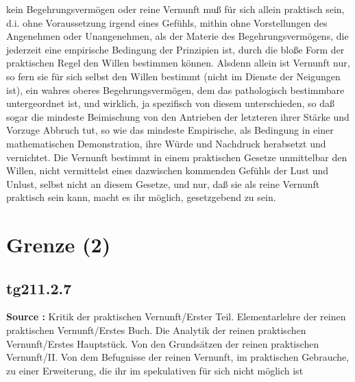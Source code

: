 \documentclass[a4paper,12pt,twoside]{book}
\newcommand{\unnumberedsection}[1]{
	\section*{#1}
	\addcontentsline{toc}{section}{#1}
	\markright{#1}
}
\begin{document}
kein Begehrungsvermögen oder reine Vernunft muß für sich allein praktisch sein, d.i. ohne Voraussetzung irgend eines Gefühls, mithin ohne Vorstellungen des Angenehmen oder Unangenehmen, als der Materie des Begehrungsvermögens, die jederzeit eine empirische Bedingung der Prinzipien ist, durch die bloße Form der praktischen Regel den Willen bestimmen können. Alsdenn allein ist Vernunft nur, so fern sie für sich selbst den Willen bestimmt (nicht im Dienste der Neigungen ist), ein wahres oberes Begehrungsvermögen, dem das pathologisch bestimmbare untergeordnet ist, und wirklich, ja spezifisch von diesem unterschieden, so daß sogar die mindeste Beimischung von den Antrieben der letzteren ihrer Stärke und Vorzuge Abbruch tut, so wie das mindeste Empirische, als Bedingung in einer mathematischen Demonstration, ihre Würde und Nachdruck herabsetzt und vernichtet. Die Vernunft bestimmt in einem praktischen Gesetze unmittelbar  den Willen, nicht vermittelst eines dazwischen kommenden Gefühls der Lust und Unlust, selbst nicht an diesem Gesetze, und nur, daß sie als reine Vernunft praktisch sein kann, macht es ihr möglich, gesetzgebend zu sein. 
	
	\unnumberedsection{Grenze (2)} 
	\subsection*{tg211.2.7} 
	\textbf{Source : }Kritik der praktischen Vernunft/Erster Teil. Elementarlehre der reinen praktischen Vernunft/Erstes Buch. Die Analytik der reinen praktischen Vernunft/Erstes Hauptstück. Von den Grundsätzen der reinen praktischen Vernunft/II. Von dem Befugnisse der reinen Vernunft, im praktischen Gebrauche, zu einer Erweiterung, die ihr im spekulativen für sich nicht möglich ist\\  
	
\end{document}
